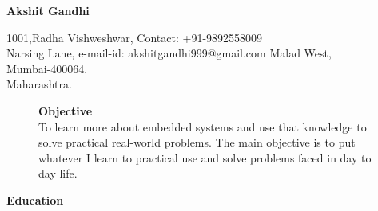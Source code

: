 \documentclass{article}
\begin{document}
	
	\begin{center}
		{
			\Large\textbf{Akshit Gandhi}
		}
		
	\end{center}
	
	\begin{flushleft}
		1001,Radha Vishweshwar, 		\hspace{2.8in}    		    Contact: +91-9892558009            \\
		Narsing Lane, 		\hspace{2.85in}		    e-mail-id: akshitgandhi999@gmail.com \hspace{2.8in}
		Malad West, \\
		Mumbai-400064.     \\
		Maharashtra.\\
		
	\end{flushleft}
	\vspace{-0.3in}
	\begin{figure}[h]
		{%
		\hspace{4.4in}
\setlength{\fboxsep}{2.5pt}%
\setlength{\fboxrule}{1pt}%
%
}%
		\begin{flushleft}
\textrm{\textbf{Objective}}\\
\textrm{To learn more about embedded systems and use that knowledge to solve practical real-world problems. The main objective is to put whatever I learn to practical use and solve problems faced in day to day life.}
\end{flushleft}
	\end{figure}
	
\begin{flushleft}
		
		\textbf{Education}
	\end{flushleft}
	
\end{document}

